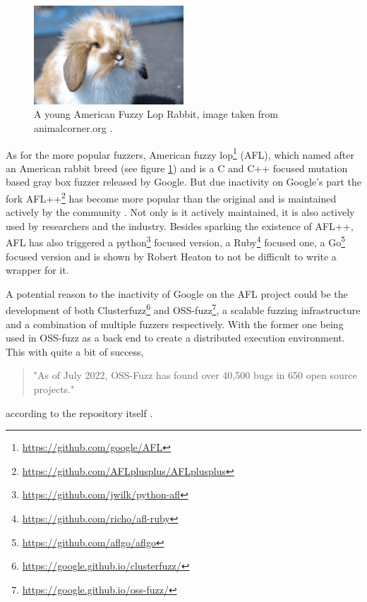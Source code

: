 \begin{figure}
	\centering
	\includegraphics[width=0.5\textwidth]{images/AFLBunny}
	\caption{A young American Fuzzy Lop Rabbit, image taken from animalcorner.org \cite{AFLBunny}.}
	\label{fig:AFLbunny}
\end{figure}

As for the more popular fuzzers, American fuzzy lop\footnote{\url{https://github.com/google/AFL}} (AFL), which named after an American rabbit breed (see figure \ref{fig:AFLbunny}) and is a C and C++ focused mutation based gray box fuzzer released by Google. But due inactivity on Google's part the fork AFL++\footnote{\url{https://github.com/AFLplusplus/AFLplusplus}} has become more popular than the original and is maintained actively by the community \cite{27AFL++}. Not only is it actively maintained, it is also actively used by researchers and the industry. Besides sparking the existence of AFL++, AFL has also triggered a python\footnote{\url{https://github.com/jwilk/python-afl}} focused version, a Ruby\footnote{\url{https://github.com/richo/afl-ruby}} focused one, a Go\footnote{\url{https://github.com/aflgo/aflgo}} focused version and is shown by Robert Heaton \cite{AFLWrapper} to not be difficult to write a wrapper for it.

A potential reason to the inactivity of Google on the AFL project could be the development of both Clusterfuzz\footnote{\url{https://google.github.io/clusterfuzz/}} and OSS-fuzz\footnote{\url{https://google.github.io/oss-fuzz/}}, a scalable fuzzing infrastructure and a combination of multiple fuzzers respectively. With the former one being used in OSS-fuzz as a back end to create a distributed execution environment. This with quite a bit of success,
\begin{quote} 
	"As of July 2022, OSS-Fuzz has found over 40,500 bugs in 650 open source projects."
\end{quote} according to the repository itself \cite{31OSS-FuzzBugs}. 

